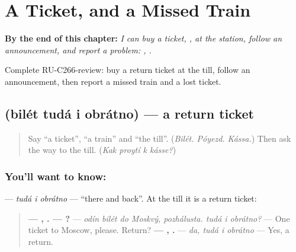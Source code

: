 
\chapter{A Ticket, and a Missed Train}
\label{ch:ru-a-ticket-and-a-missed-train}

\begin{chapteropening}
\textbf{By the end of this chapter:} \emph{I can buy a ticket,   , at the station, follow an announcement, and report a problem:    ,   .}

Complete RU-C266-review: buy a return ticket at the till, follow an announcement, then report a missed train and a lost ticket.
\end{chapteropening}

\section[\texorpdfstring{\ru{билет} \ru{туда} \ru{и} … (bilét tudá i …)}{билет туда и … (bilét tudá i …)}]{    (bilét tudá i obrátno) — a return ticket}

\label{lesson:RU-C266-tuda-i-obratno}



\begin{quote}
Say \textquotedblleft{}a ticket\textquotedblright{}, \textquotedblleft{}a train\textquotedblright{} and \textquotedblleft{}the till\textquotedblright{}. (\emph{Bilét. Póyezd. Kássa.}) Then ask the way to the till. (\emph{Kak proytí k kásse?})
\end{quote}

\subsection*{You'll want to know:   }
\textbf{  } — \emph{tudá i obrátno} — \textquotedblleft{}there and back\textquotedblright{}. At the till it is a return ticket:

\begin{quote}
\textbf{—    , . —   ?} — \emph{odín bilét do Moskvý, pozhálusta. tudá i obrátno?} — One ticket to Moscow, please. Return? \textbf{— ,   .} — \emph{da, tudá i obrátno} — Yes, a return.
\end{quote}

